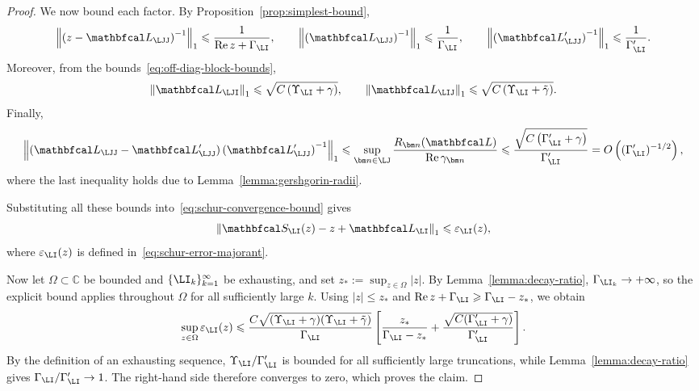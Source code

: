 \documentclass{SciPost}
\renewcommand{\Re}{\operatorname{Re}}
\begin{document}
\begin{proof}
    We now bound each factor. By Proposition~\ref{prop:simplest-bound},
    \begin{equation}
        \left \|
        \left(z - \mathbfcal L_\LJJ\right)^{-1}
        \right \|_1
        \leqslant
        \frac{1}{\Re z+\Gamma_\LI},
        \qquad
        \left \|
        \left(\mathbfcal L_\LJJ\right)^{-1}
        \right \|_1
        \leqslant
        \frac{1}{\Gamma_\LI},
        \qquad
        \left \|
        \left(\mathbfcal L'_\LJJ\right)^{-1}
        \right \|_1
        \leqslant
        \frac{1}{\Gamma'_\LI}.
    \end{equation}
    Moreover, from the bounds~\eqref{eq:off-diag-block-bounds},
    \begin{equation}
        \left \| \mathbfcal L_\LJI \right \|_1
        \leqslant
        \sqrt{C\left(\Upsilon_\LI + \gamma\right)},
        \qquad
        \left \| \mathbfcal L_\LIJ \right \|_1
        \leqslant
        \sqrt{C\left(\Upsilon_\LI + \tilde \gamma\right)}.
    \end{equation}
    Finally,
    \begin{equation}
        \left \|
            \left(
                \mathbfcal L_\LJJ - \mathbfcal L'_\LJJ
            \right)
            \left(\mathbfcal L'_\LJJ\right)^{-1}
        \right \|_1
        \leqslant
        \sup_{\bm n \in \LJ}
        \frac{R_{\bm n}(\mathbfcal L)}{\Re \gamma_{\bm n}} \leqslant
        \frac{\sqrt{C\left(\Gamma'_\LI + \gamma\right)}}{\Gamma'_\LI} =
        O\left(
            (\Gamma'_\LI)^{-1/2}
        \right),
    \end{equation}
    where the last inequality holds due to Lemma~\ref{lemma:gershgorin-radii}.

    Substituting all these bounds into~\eqref{eq:schur-convergence-bound} gives
    \begin{equation}
        \left \|
        \mathbfcal S_\LI(z) - z + \mathbfcal L_\LI
        \right \|_1
        \leqslant
        \varepsilon_\LI(z),
    \end{equation}
    where $\varepsilon_\LI(z)$ is defined in~\eqref{eq:schur-error-majorant}.

    Now let $\Omega\subset\mathbb C$ be bounded and $\{\LI_k\}_{k=1}^\infty$ be exhausting, and set $z_*:=\sup_{z\in\Omega}|z|$. By Lemma~\ref{lemma:decay-ratio}, $\Gamma_{\LI_k}\to+\infty$, so the explicit bound applies throughout $\Omega$ for all sufficiently large $k$. Using $|z|\leqslant z_*$ and $\Re z+\Gamma_\LI\geqslant\Gamma_\LI-z_*$, we obtain
    \begin{equation}
        \sup_{z\in\Omega}\varepsilon_\LI(z)
        \leqslant
        \frac{
            C\sqrt{(\Upsilon_\LI+\gamma)(\Upsilon_\LI+\tilde\gamma)}
        }{\Gamma_\LI}
        \left[
            \frac{z_*}{\Gamma_\LI-z_*}
            +
            \frac{\sqrt{C(\Gamma_\LI'+\gamma)}}{\Gamma_\LI'}
        \right].
    \end{equation}
    By the definition of an exhausting sequence, $\Upsilon_\LI/\Gamma'_\LI$ is bounded for all sufficiently large truncations, while Lemma~\ref{lemma:decay-ratio} gives $\Gamma_\LI/\Gamma'_\LI\to1$. The right-hand side therefore converges to zero, which proves the claim.
\end{proof}
\end{document}
